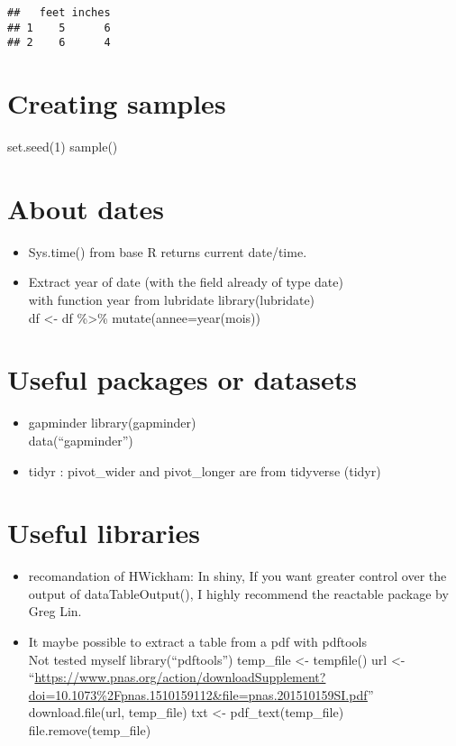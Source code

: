 \documentclass[
]{book}
\begin{document}
\begin{verbatim}
##   feet inches
## 1    5      6
## 2    6      4
\end{verbatim}

\hypertarget{creating-samples}{%
\section{Creating samples}\label{creating-samples}}

set.seed(1)
sample()

\hypertarget{about-dates}{%
\section{About dates}\label{about-dates}}

\begin{itemize}
\item
  Sys.time() from base R returns current date/time.
\item
  Extract year of date (with the field already of type date)\\
  with function year from lubridate
  library(lubridate)\\
  df \textless- df \%\textgreater\% mutate(annee=year(mois))
\end{itemize}

\hypertarget{useful-packages-or-datasets}{%
\section{Useful packages or datasets}\label{useful-packages-or-datasets}}

\begin{itemize}
\item
  gapminder
  library(gapminder)\\
  data(``gapminder'')
\item
  tidyr :
  pivot\_wider and pivot\_longer are from tidyverse (tidyr)
\end{itemize}

\hypertarget{useful-libraries}{%
\section{Useful libraries}\label{useful-libraries}}

\begin{itemize}
\item
  recomandation of HWickham:
  In shiny, If you want greater control over the output of dataTableOutput(), I highly recommend the reactable package by Greg Lin.
\item
  It maybe possible to extract a table from a pdf with pdftools\\
  Not tested myself
  library(``pdftools'')
  temp\_file \textless- tempfile()
  url \textless- ``\url{https://www.pnas.org/action/downloadSupplement?doi=10.1073\%2Fpnas.1510159112\&file=pnas.201510159SI.pdf}''
  download.file(url, temp\_file)
  txt \textless- pdf\_text(temp\_file)
  file.remove(temp\_file)
\end{itemize}
\end{document}
